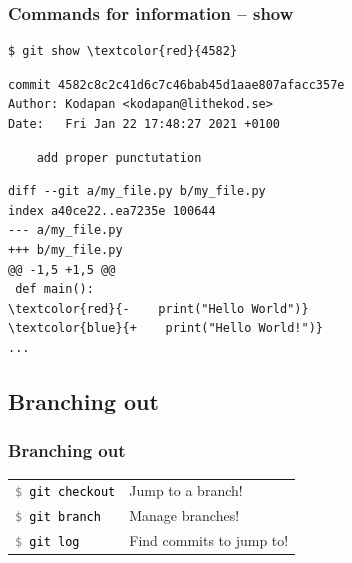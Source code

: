 \documentclass{beamer}
\newcommand{\command}[1]{\colorbox{black!90!white!10!}{\vphantom{Ep}\texttt{\textcolor{gray}{\$} \textcolor{black}{#1}}}}
\begin{document}
\begin{frame}[fragile]
  \frametitle{Commands for information -- show}
\begin{Verbatim}[commandchars=\\\{\}]
$ git show \textcolor{red}{4582}
\end{Verbatim}
\pause{}
\vspace{-2.5ex}
\begin{verbatim}
commit 4582c8c2c41d6c7c46bab45d1aae807afacc357e
Author: Kodapan <kodapan@lithekod.se>
Date:   Fri Jan 22 17:48:27 2021 +0100
\end{verbatim}
\vspace{-3ex}
\begin{verbatim}
    add proper punctutation
\end{verbatim}
\vspace{-2ex}
\begin{Verbatim}[commandchars=\\\{\}]
diff --git a/my_file.py b/my_file.py
index a40ce22..ea7235e 100644
--- a/my_file.py
+++ b/my_file.py
@@ -1,5 +1,5 @@
 def main():
\textcolor{red}{-    print("Hello World")}
\textcolor{blue}{+    print("Hello World!")}
...
\end{Verbatim}
\end{frame}

\subsection{Branching out}

\begin{frame}[fragile]
  \frametitle{Branching out}

  \begin{tabular}{ll}
    \command{git checkout} & Jump to a branch! \\
    \command{git branch} & Manage branches! \\
    \command{git log} & Find commits to jump to! \\
  \end{tabular}

\end{frame}
\end{document}
